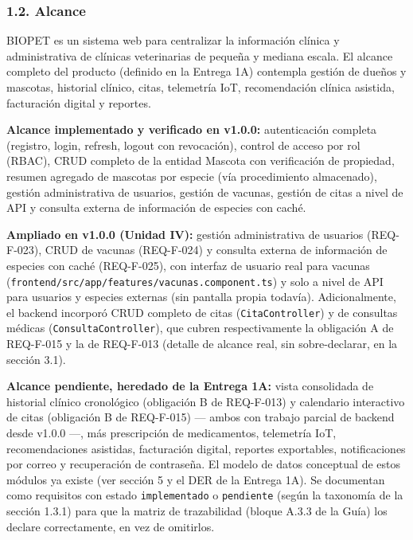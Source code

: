 \documentclass[
  spanish,
]{article}
\begin{document}
\subsubsection{1.2. Alcance}\label{alcance}

BIOPET es un sistema web para centralizar la información clínica y
administrativa de clínicas veterinarias de pequeña y mediana escala. El
alcance completo del producto (definido en la Entrega 1A) contempla
gestión de dueños y mascotas, historial clínico, citas, telemetría IoT,
recomendación clínica asistida, facturación digital y reportes.

\textbf{Alcance implementado y verificado en v1.0.0:} autenticación
completa (registro, login, refresh, logout con revocación), control de
acceso por rol (RBAC), CRUD completo de la entidad Mascota con
verificación de propiedad, resumen agregado de mascotas por especie (vía
procedimiento almacenado), gestión administrativa de usuarios, gestión
de vacunas, gestión de citas a nivel de API y consulta externa de
información de especies con caché.

\textbf{Ampliado en v1.0.0 (Unidad IV):} gestión administrativa de
usuarios (REQ-F-023), CRUD de vacunas (REQ-F-024) y consulta externa de
información de especies con caché (REQ-F-025), con interfaz de usuario
real para vacunas
(\texttt{frontend/\allowbreak{}src/\allowbreak{}app/\allowbreak{}features/\allowbreak{}vacunas.\allowbreak{}component.\allowbreak{}ts}) y solo a nivel
de API para usuarios y especies externas (sin pantalla propia todavía).
Adicionalmente, el backend incorporó CRUD completo de citas
(\texttt{Cita\allowbreak{}Controller}) y de consultas médicas
(\texttt{Consulta\allowbreak{}Controller}), que cubren respectivamente la obligación
A de REQ-F-015 y la de REQ-F-013 (detalle de alcance real, sin
sobre-declarar, en la sección 3.1).

\textbf{Alcance pendiente, heredado de la Entrega 1A:} vista consolidada
de historial clínico cronológico (obligación B de REQ-F-013) y
calendario interactivo de citas (obligación B de REQ-F-015) --- ambos
con trabajo parcial de backend desde v1.0.0 ---, más prescripción de
medicamentos, telemetría IoT, recomendaciones asistidas, facturación
digital, reportes exportables, notificaciones por correo y recuperación
de contraseña. El modelo de datos conceptual de estos módulos ya existe
(ver sección 5 y el DER de la Entrega 1A). Se documentan como requisitos
con estado \texttt{implementado} o \texttt{pendiente} (según la
taxonomía de la sección 1.3.1) para que la matriz de trazabilidad
(bloque A.3.3 de la Guía) los declare correctamente, en vez de
omitirlos.
\end{document}
